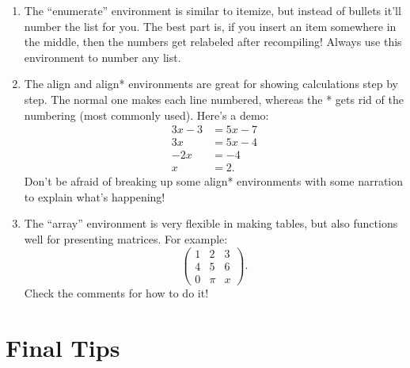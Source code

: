 \documentclass[12pt]{article}
\begin{document}
	\begin{enumerate}
		
		\item The ``enumerate'' environment is similar to itemize, but instead of bullets it'll number the list for you. The best part is, if you insert an item somewhere in the middle, then the numbers get relabeled after recompiling! Always use this environment to number any list. 
		
		\item The align and align* environments are great for showing calculations step by step. The normal one makes each line numbered, whereas the * gets rid of the numbering (most commonly used). Here's a demo:
		\begin{align*}
			3x - 3 &= 5x - 7 \\
			3x &= 5x - 4 \\
			-2x &= -4 \\
			x &= 2.
		\end{align*}
		Don't be afraid of breaking up some align* environments with some narration to explain what's happening!
		
		\item The ``array'' environment is very flexible in making tables, but also functions well for presenting matrices. For example:
		\[
		\left( \begin{array}{ccc} 1 & 2 & 3 \\ 4 & 5 & 6 \\ 0 & \pi & x \end{array} \right).
		\]
		Check the comments for how to do it!
		
	\end{enumerate}

	\section{Final Tips}
	
\end{document}
